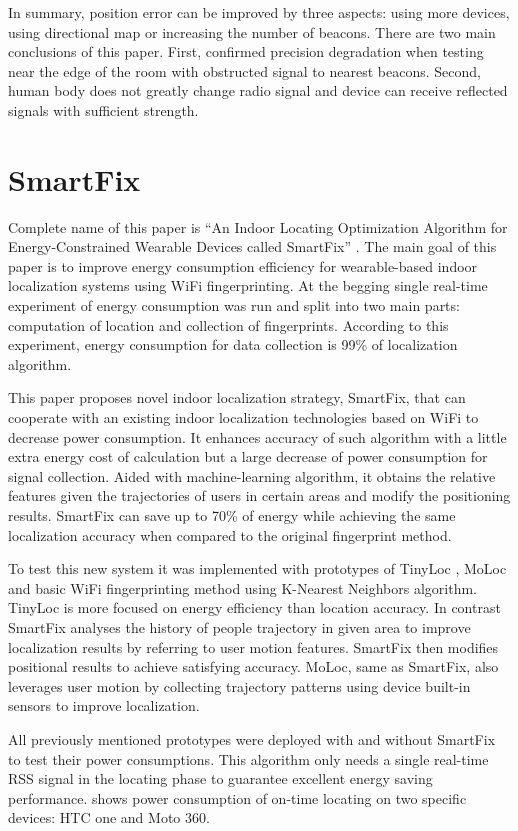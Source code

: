 In summary, position error can be improved by three aspects: using more devices, using directional map or increasing the number of beacons. There are two main conclusions of this paper. First, confirmed precision degradation when testing near the edge of the room with obstructed signal to nearest beacons. Second, human body does not greatly change radio signal and device can receive reflected signals with sufficient strength. 

\section{SmartFix}\label{sec:SmartFix}
Complete name of this paper is \enquote{An Indoor Locating Optimization Algorithm for Energy-Constrained Wearable Devices called SmartFix} \cite{SmartFix}. The main goal of this paper is to improve energy consumption efficiency for wearable-based indoor localization systems using WiFi fingerprinting. At the begging single real-time experiment of energy consumption was run and split into two main parts: computation of location and collection of fingerprints. According to this experiment, energy consumption for data collection is 99\% of localization algorithm.

This paper proposes novel indoor localization strategy, SmartFix, that can cooperate with an existing indoor localization technologies based on WiFi to decrease power consumption. It enhances accuracy of such algorithm with a little extra energy cost of calculation but a large decrease of power consumption for signal collection. Aided with machine-learning algorithm, it obtains the relative features given the trajectories of users in certain areas and modify the positioning results. SmartFix can save up to 70\% of energy while achieving the same localization accuracy when compared to the original fingerprint method.

To test this new system it was implemented with prototypes of TinyLoc \cite{TinyLoc}, MoLoc \cite{MoLoc} and basic WiFi fingerprinting method using K-Nearest Neighbors algorithm. TinyLoc is more focused on energy efficiency than location accuracy. In contrast SmartFix analyses the history of people trajectory in given area to improve localization results by referring to user motion features. SmartFix then modifies positional results to achieve satisfying accuracy. MoLoc, same as SmartFix, also leverages user motion by collecting trajectory patterns using device built-in sensors to improve localization.

All previously mentioned prototypes were deployed with and without SmartFix to test their power consumptions. This algorithm only needs a single real-time RSS signal in the locating phase to guarantee excellent energy saving performance.  shows power consumption of on-time locating on two specific devices: HTC one and Moto 360. 

